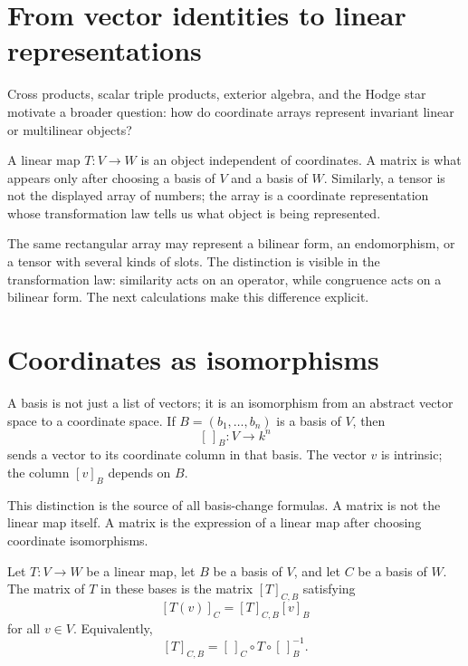 
\section{From vector identities to linear representations}

Cross products, scalar triple products, exterior algebra, and the Hodge star motivate a broader question: how do coordinate arrays represent invariant linear or multilinear objects?

A linear map \(T:V\to W\) is an object independent of coordinates.  A matrix is what appears only after choosing a basis of \(V\) and a basis of \(W\).  Similarly, a tensor is not the displayed array of numbers; the array is a coordinate representation whose transformation law tells us what object is being represented.

\begin{remark}
The same rectangular array may represent a bilinear form, an endomorphism, or a tensor with several kinds of slots. The distinction is visible in the transformation law: similarity acts on an operator, while congruence acts on a bilinear form. The next calculations make this difference explicit.
\end{remark}


\section{Coordinates as isomorphisms}

A basis is not just a list of vectors; it is an isomorphism from an abstract vector space to a coordinate space.  If \(B=(b_1,\ldots,b_n)\) is a basis of \(V\), then
\[
  [\,]_B:V\longrightarrow k^n
\]
sends a vector to its coordinate column in that basis.  The vector \(v\) is intrinsic; the column \([v]_B\) depends on \(B\).

This distinction is the source of all basis-change formulas.  A matrix is not the linear map itself.  A matrix is the expression of a linear map after choosing coordinate isomorphisms.

\begin{definition}
Let \(T:V\to W\) be a linear map, let \(B\) be a basis of \(V\), and let \(C\) be a basis of \(W\).  The matrix of \(T\) in these bases is the matrix \([T]_{C,B}\) satisfying
\[
  [T(v)]_C=[T]_{C,B}[v]_B
\]
for all \(v\in V\).  Equivalently,
\[
  [T]_{C,B}=[\,]_C\circ T\circ [\,]_B^{-1}.
\]
\end{definition}

